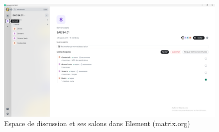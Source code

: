 \documentclass[../Livrable1.tex]{subfiles}
\begin{document}
\begin{figure}[h]
    \centering
    \includegraphics[width=1\textwidth]{../images/element.png}
    \caption{Espace de discussion et ses salons dans Element (matrix.org)}
    \label{fig:solution4}
\end{figure}
\end{document}
